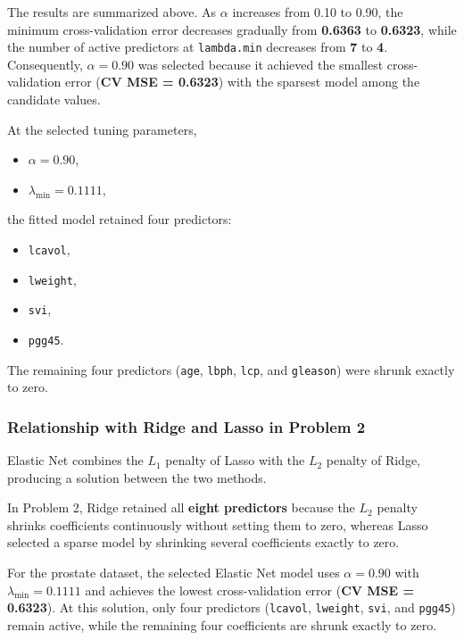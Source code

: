 \documentclass[
  11pt,
]{article}
\providecommand{\tightlist}{%
  \setlength{\itemsep}{0pt}\setlength{\parskip}{0pt}}
\begin{document}
The results are summarized above. As \(\alpha\) increases from 0.10 to
0.90, the minimum cross-validation error decreases gradually from
\textbf{0.6363} to \textbf{0.6323}, while the number of active
predictors at \texttt{lambda.min} decreases from \textbf{7} to
\textbf{4}. Consequently, \(\alpha=0.90\) was selected because it
achieved the smallest cross-validation error (\textbf{CV MSE = 0.6323})
with the sparsest model among the candidate values.

At the selected tuning parameters,

\begin{itemize}
\tightlist
\item
  \(\alpha = 0.90\),
\item
  \(\lambda_{\min}=0.1111\),
\end{itemize}

the fitted model retained four predictors:

\begin{itemize}
\tightlist
\item
  \texttt{lcavol},
\item
  \texttt{lweight},
\item
  \texttt{svi},
\item
  \texttt{pgg45}.
\end{itemize}

The remaining four predictors (\texttt{age}, \texttt{lbph},
\texttt{lcp}, and \texttt{gleason}) were shrunk exactly to zero.

\subsubsection{Relationship with Ridge and Lasso in Problem
2}\label{relationship-with-ridge-and-lasso-in-problem-2}

Elastic Net combines the \(L_1\) penalty of Lasso with the \(L_2\)
penalty of Ridge, producing a solution between the two methods.

In Problem 2, Ridge retained all \textbf{eight predictors} because the
\(L_2\) penalty shrinks coefficients continuously without setting them
to zero, whereas Lasso selected a sparse model by shrinking several
coefficients exactly to zero.

For the prostate dataset, the selected Elastic Net model uses
\(\alpha=0.90\) with \(\lambda_{\min}=0.1111\) and achieves the lowest
cross-validation error (\textbf{CV MSE = 0.6323}). At this solution,
only four predictors (\texttt{lcavol}, \texttt{lweight}, \texttt{svi},
and \texttt{pgg45}) remain active, while the remaining four coefficients
are shrunk exactly to zero.
\end{document}

